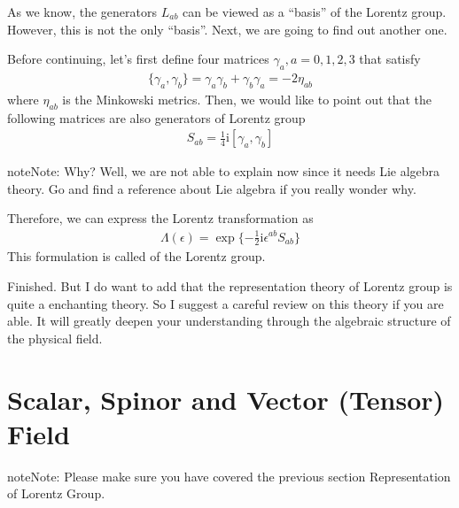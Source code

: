 \documentclass[letterpaper,10pt,english]{sphinxmanual}
\begin{document}
As we know, the generators \(L_{ab}\) can be viewed as a ``basis'' of the Lorentz group. However, this is not the only ``basis''. Next, we are going to find out another one.

Before continuing, let's first define four matrices \(\gamma_a, a=0,1,2,3\) that satisfy
\begin{equation*}
\begin{split}\{\gamma_a, \gamma_b\} = \gamma_a\gamma_b + \gamma_b\gamma_a = -2\eta_{ab}\end{split}
\end{equation*}
where \(\eta_{ab}\) is the Minkowski metrics. Then, we would like to point out that the following matrices are also generators of Lorentz group
\begin{equation*}
\begin{split}S_{ab} = \frac{1}{4}\mathrm{i}[\gamma_a, \gamma_b]\end{split}
\end{equation*}
\begin{sphinxadmonition}{note}{Note:}
Why? Well, we are not able to explain now since it needs Lie algebra theory. Go and find a reference about Lie algebra if you really wonder why.
\end{sphinxadmonition}

Therefore, we can express the Lorentz transformation as
\begin{equation*}
\begin{split}\varLambda(\epsilon) = \exp\{-\frac{1}{2}\mathrm{i}\epsilon^{ab}S_{ab}\}\end{split}
\end{equation*}
This formulation is called  of the Lorentz group.

Finished. But I do want to add that the representation theory of Lorentz group is quite a enchanting theory. So I suggest a careful review on this theory if you are able. It will greatly deepen your understanding through the algebraic structure of the physical field.


\section{Scalar, Spinor and Vector (Tensor) Field}
\label{\detokenize{field:scalar-spinor-and-vector-tensor-field}}\label{\detokenize{field::doc}}
\begin{sphinxadmonition}{note}{Note:}
Please make sure you have covered the previous section Representation of Lorentz Group.
\end{sphinxadmonition}
\end{document}
